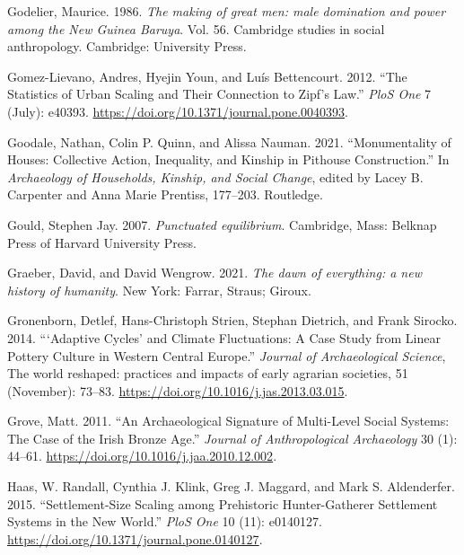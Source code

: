 \documentclass[
  12pt,
  a4paper, twoside]{book}
\newlength{\cslhangindent}
\newlength{\cslentryspacingunit} %
\newenvironment{CSLReferences}[2] %
 {%
  \setlength{\parindent}{0pt}
  \ifodd #1
  \let\oldpar\par
  \def\par{\hangindent=\cslhangindent\oldpar}
  \fi
  \setlength{\parskip}{#2\cslentryspacingunit}
 }%
 {}
\begin{document}
\begin{CSLReferences}{1}{0}
\leavevmode{}%
Godelier, Maurice. 1986. \emph{The making of great men: male domination and power among the New Guinea Baruya}. Vol. 56. Cambridge studies in social anthropology. Cambridge: University Press.

\leavevmode{}%
Gomez-Lievano, Andres, Hyejin Youn, and Luís Bettencourt. 2012. {``The Statistics of Urban Scaling and Their Connection to Zipf{'}s Law.''} \emph{PloS One} 7 (July): e40393. \url{https://doi.org/10.1371/journal.pone.0040393}.

\leavevmode{}%
Goodale, Nathan, Colin P. Quinn, and Alissa Nauman. 2021. {``Monumentality of Houses: {Collective} Action, Inequality, and Kinship in Pithouse Construction.''} In \emph{Archaeology of {Households}, {Kinship}, and {Social Change}}, edited by Lacey B. Carpenter and Anna Marie Prentiss, 177--203. {Routledge}.

\leavevmode{}%
Gould, Stephen Jay. 2007. \emph{Punctuated equilibrium}. Cambridge, Mass: Belknap Press of Harvard University Press.

\leavevmode{}%
Graeber, David, and David Wengrow. 2021. \emph{The dawn of everything: a new history of humanity}. New York: Farrar, Straus; Giroux.

\leavevmode{}%
Gronenborn, Detlef, Hans-Christoph Strien, Stephan Dietrich, and Frank Sirocko. 2014. {``{`}Adaptive Cycles{'} and Climate Fluctuations: A Case Study from Linear Pottery Culture in Western Central Europe.''} \emph{Journal of Archaeological Science}, The world reshaped: practices and impacts of early agrarian societies, 51 (November): 73--83. \url{https://doi.org/10.1016/j.jas.2013.03.015}.

\leavevmode{}%
Grove, Matt. 2011. {``An Archaeological Signature of Multi-Level Social Systems: The Case of the Irish Bronze Age.''} \emph{Journal of Anthropological Archaeology} 30 (1): 44--61. \url{https://doi.org/10.1016/j.jaa.2010.12.002}.

\leavevmode{}%
Haas, W. Randall, Cynthia J. Klink, Greg J. Maggard, and Mark S. Aldenderfer. 2015. {``Settlement-Size Scaling among Prehistoric Hunter-Gatherer Settlement Systems in the New World.''} \emph{PloS One} 10 (11): e0140127. \url{https://doi.org/10.1371/journal.pone.0140127}.


\end{CSLReferences}
\end{document}
